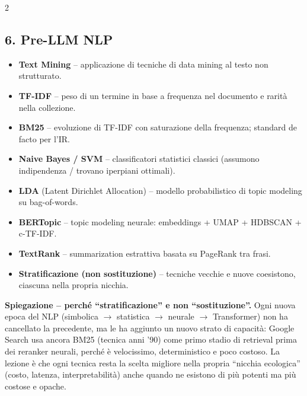 \documentclass[10pt,a4paper]{extarticle}
\begin{document}
\begin{multicols}{2}
\subsection*{6. Pre-LLM NLP}
\begin{itemize}
\item \textbf{Text Mining} -- applicazione di tecniche di data mining al testo non strutturato.
\item \textbf{TF-IDF} -- peso di un termine in base a frequenza nel documento e rarit\`a nella collezione.
\item \textbf{BM25} -- evoluzione di TF-IDF con saturazione della frequenza; standard de facto per l'IR.
\item \textbf{Naive Bayes / SVM} -- classificatori statistici classici (assumono indipendenza / trovano iperpiani ottimali).
\item \textbf{LDA} (Latent Dirichlet Allocation) -- modello probabilistico di topic modeling su bag-of-words.
\item \textbf{BERTopic} -- topic modeling neurale: embeddings + UMAP + HDBSCAN + c-TF-IDF.
\item \textbf{TextRank} -- summarization estrattiva basata su PageRank tra frasi.
\item \textbf{Stratificazione (non sostituzione)} -- tecniche vecchie e nuove coesistono, ciascuna nella propria nicchia.
\end{itemize}
\smallskip\noindent\textbf{\textcolor{blue!45!black}{Spiegazione -- perch\'e ``stratificazione'' e non ``sostituzione''.}} Ogni nuova epoca del NLP (simbolica $\to$ statistica $\to$ neurale $\to$ Transformer) non ha cancellato la precedente, ma le ha aggiunto un nuovo strato di capacit\`a: Google Search usa ancora BM25 (tecnica anni '90) come primo stadio di retrieval prima dei reranker neurali, perch\'e \`e velocissimo, deterministico e poco costoso. La lezione \`e che ogni tecnica resta la scelta migliore nella propria ``nicchia ecologica'' (costo, latenza, interpretabilit\`a) anche quando ne esistono di pi\`u potenti ma pi\`u costose e opache.


\end{multicols}
\end{document}
